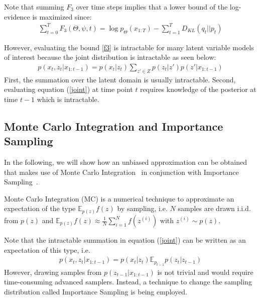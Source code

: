 Note that summing $F_3$ over time steps implies that a lower bound of the log-evidence is maximized since:
\begin{align*}
\sum_{t=0}^T F_3(\Theta, \psi, t) = \log p_\Theta(x_{1:T}) - \sum_{t=1}^T D_{KL}(q_t || p_t)
\end{align*}

However, evaluating the bound \ref{f3} is intractable for many latent variable models of interest because the joint distribution is intractable as seen below:
\begin{align}
p(x_t,z_t|x_{1:t-1}) = p(x_t|z_t) \sum_{z' \in Z} p(z_t|z') p(z' | x_{1:t-1}) \label{joint}
\end{align}
First, the summation over the latent domain is usually intractable. Second, evaluating equation (\ref{joint}) at time point $t$ requires knowledge of the posterior at time $t-1$ which is intractable.

\subsection{Monte Carlo Integration and Importance Sampling}
\label{MC-IS}
In the following, we will show how an unbiased approximation can be obtained that makes use of Monte Carlo Integration~\cite{geweke1989bayesian} in conjunction with Importance Sampling~\cite{mcbook}.

Monte Carlo Integration (MC) is a numerical technique to approximate an expectation of the type $\mathbb E_{p(z)} f(z)$ by sampling, i.e. $N$ samples are drawn i.i.d. from $p(z)$ and $\mathbb E_{p(z)} f(z) \approx \frac{1}{N} \sum_{i=1}^N f(z^{(i)})$ with $z^{(i)} \sim p(z)$.

Note that the intractable summation in equation (\ref{joint}) can be written as an expectation of this type, i.e. 
\begin{align}
p(x_t,z_t|x_{1:t-1}) = p(x_t|z_t) \mathbb E_{p_{t-1}} p(z_t|z_{t-1})  \label{joint2}
\end{align}
However, drawing samples from $p(z_{t-1} | x_{1:t-1})$ is not trivial and would require time-consuming advanced samplers. Instead, a technique to change the sampling distribution called Importance Sampling is being employed.

